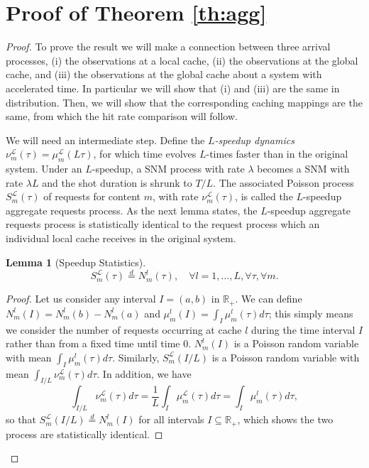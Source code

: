 \documentclass[10pt, conference, letterpaper]{IEEEtran}
\newtheorem{lemma}[theorem]{Lemma}
\def\R{\mathbb{R}}
\begin{document}
\section{Proof of Theorem \ref{th:agg}}\label{app:b}
\begin{proof}
 To prove the result we will make a connection between three arrival processes, (i) the observations at a local cache, (ii) the observations at the global cache, and (iii) the observations at the global cache about a system with accelerated time. In particular we will show that (i) and (iii) are the same in distribution. Then, we will show that the corresponding caching mappings are the same, from which the hit rate comparison will follow.

We will need an intermediate step. Define the \emph{$L$-speedup dynamics} $\nu_m^\mathcal L(\tau)=\mu_m^\mathcal L(L\tau)$, for which time evolves $L$-times faster than in the original system.
Under an $L$-speedup, a SNM process with rate $\lambda$ becomes a SNM with rate $\lambda L$ and the shot duration is shrunk to $T/L$. The associated Poisson process $S^\mathcal L_m(\tau)$ of requests for content $m$, with rate $\nu_m^\mathcal L(\tau)$, is called the $L$-speedup aggregate requests process. As the next lemma states, the $L$-speedup aggregate requests process is statistically identical to the request process which an individual local cache receives in the original system.
\begin{lemma}[Speedup Statistics]\label{lem:agg}
\[
S^\mathcal L_m(\tau)\stackrel{d}{=}N_m^l(\tau),\quad \forall l=1,\dots,L, \forall \tau, \forall m.
\]
\end{lemma}
\begin{proof}
Let us consider any interval $I=(a,b)$ in $\R_+$. We can define $N_m^l(I)=N_m^l(b)-N_m^l(a)$ and $\mu_m^l(I)=\int_I\mu_m^l(\tau)d\tau$; this simply means we consider the number of requests occurring at cache $l$ during the time interval $I$ rather than from a fixed time until time $0$. $N_m^l(I)$ is a Poisson random variable with mean $\int_I\mu_m^l(\tau)d\tau$. Similarly, $S^\mathcal L_m(I/L)$ is a Poisson random variable with mean $\int_{I/L}\nu_m^\mathcal L(\tau)d\tau$. In addition, we have $$\int_{I/L}\nu_m^\mathcal L(\tau)d\tau=\frac{1}{L}\int_I\mu_m^\mathcal L(\tau)d\tau=\int_I\mu_m^l(\tau)d\tau,$$ so that $S_m^\mathcal L(I/L)\overset d=N_m^l(I)$ for all intervals $I\subseteq \R_+$, which shows the two process are statistically identical.
\end{proof}

\end{proof}
\end{document}
